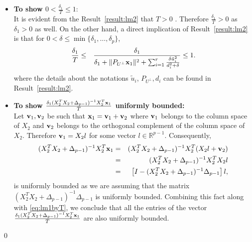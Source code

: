 \documentclass[noinfoline,11pt]{imsart}
\numberwithin{equation}{section}
\theoremstyle{plain}
\newcommand{\lmDelta}{\Delta}
\newcommand{\lmdelta}{\delta}
\newcommand{\lmX}{X}
\newcommand{\lmU}{U}
\newcommand{\lmu}{u}
\newcommand{\R}{\mathbb{R}}
\newcommand{\norm}[1]{ \Vert #1 \Vert }
\newcommand{\lmA}{A}
\newcommand{\lmxbf}{{\bf x}}
\newcommand{\lmxv}{{\bf v}}
\begin{document}
\begin{itemize}
\item { \bf To show $0<\frac{\lmdelta_1}{T}\leq 1:$  }\\
It is evident from the Result~\ref{result:lm2} that  $T>0$ .   Therefore $ \frac{\lmdelta_1}{T}>0$ as $\delta_1>0$ as well.  On the other hand, a direct implication of Result~\ref{result:lm2} is that for $0<\lmdelta\leq \min\{\lmdelta_1, \ldots , \lmdelta_p\}$, 
\begin{eqnarray}\label{eq:lm1byT}
\frac{\lmdelta_1}{T}
& \leq  &\frac{\lmdelta_1}{ \lmdelta_1+\norm{P_{U^\perp}\lmxbf_1}^2+\sum_{i=1}^{r} \frac{\lmdelta\tilde{\lmu}^2_i}{d_i^2+\lmdelta}    }\leq  1.
\end{eqnarray}
where the details about the notations  $\tilde{\lmu}_i$, $ P_{\lmU^\perp} , d_i $ can be found in Result~\ref{result:lm2}. \\

\item {\bf To show $ \frac{ \lmdelta_1 (\lmX_2^T\lmX_2+\lmDelta_{p-1})^{-1} \lmX_2^T\lmxbf_1}{T}  $ uniformly bounded:       }\\
Let $\lmxv_1, \lmxv_2$ be such that $\lmxbf_1=\lmxv_1+ \lmxv_2$ where $\lmxv_1$ belongs to the column space of $\lmX_2$ and $\lmxv_2$ belongs to the orthogonal complement of the column space of $\lmX_2$. Therefore $\lmxv_1=\lmX_2 l $ for some vector  $l\in \R^{p-1}$. Consequently, 
\begin{eqnarray}\label{eq:lmUNIFpartRow1}
  (\lmX_2^T\lmX_2+\lmDelta_{p-1})^{-1} \lmX_2^T\lmxbf_1
& =& (\lmX_2^T\lmX_2+\lmDelta_{p-1})^{-1}\lmX_2^T( \lmX_2 l +\lmxv_2 ) \nonumber\\
& =&(\lmX_2^T\lmX_2+\lmDelta_{p-1})^{-1}\lmX_2^T\lmX_2 l \nonumber\\
& =&  \left [ I-  (\lmX_2^T\lmX_2+\lmDelta_{p-1})^{-1}\lmDelta_{p-1}\right] l , \nonumber
\end{eqnarray}
is uniformly bounded as  we are assuming that the matrix  $(\lmX_2^T\lmX_2+\lmDelta_{p-1})^{-1}\lmDelta_{p-1}$ is uniformly bounded. Combining this fact along with \ref{eq:lm1byT}, we conclude that all the entries of the  vector  $\frac{ \lmdelta_1 (\lmX_2^T\lmX_2+\lmDelta_{p-1})^{-1} \lmX_2^T\lmxbf_1}{T}  $  are also uniformly bounded. 
\end{itemize}
\qed
\end{document}
